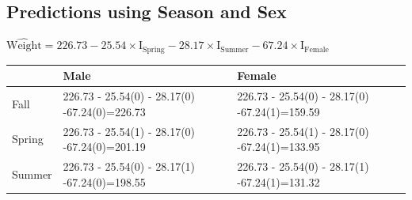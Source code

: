 \documentclass[]{book}
\begin{document}
\subsection{Predictions using Season and
Sex}\label{predictions-using-season-and-sex}

\(\widehat{\text{Weight}} = 226.73-25.54 \times\text{I}_{\text{Spring}}-28.17\times\text{I}_{\text{Summer}} -67.24\times\text{I}_{\text{Female}}\)

\begin{longtable}[]{@{}lll@{}}
\toprule
\begin{minipage}[b]{0.09\columnwidth}\raggedright\strut
\strut
\end{minipage} & \begin{minipage}[b]{0.14\columnwidth}\raggedright\strut
Male\strut
\end{minipage} & \begin{minipage}[b]{0.14\columnwidth}\raggedright\strut
Female\strut
\end{minipage}\tabularnewline
\midrule
\endhead
\begin{minipage}[t]{0.09\columnwidth}\raggedright\strut
Fall\strut
\end{minipage} & \begin{minipage}[t]{0.14\columnwidth}\raggedright\strut
226.73 - 25.54(0) - 28.17(0) -67.24(0)=226.73\strut
\end{minipage} & \begin{minipage}[t]{0.14\columnwidth}\raggedright\strut
226.73 - 25.54(0) - 28.17(0) -67.24(1)=159.59\strut
\end{minipage}\tabularnewline
\begin{minipage}[t]{0.09\columnwidth}\raggedright\strut
Spring\strut
\end{minipage} & \begin{minipage}[t]{0.14\columnwidth}\raggedright\strut
226.73 - 25.54(1) - 28.17(0) -67.24(0)=201.19\strut
\end{minipage} & \begin{minipage}[t]{0.14\columnwidth}\raggedright\strut
226.73 - 25.54(1) - 28.17(0) -67.24(1)=133.95\strut
\end{minipage}\tabularnewline
\begin{minipage}[t]{0.09\columnwidth}\raggedright\strut
Summer\strut
\end{minipage} & \begin{minipage}[t]{0.14\columnwidth}\raggedright\strut
226.73 - 25.54(0) - 28.17(1) -67.24(0)=198.55\strut
\end{minipage} & \begin{minipage}[t]{0.14\columnwidth}\raggedright\strut
226.73 - 25.54(0) - 28.17(1) -67.24(1)=131.32\strut
\end{minipage}\tabularnewline
\bottomrule
\end{longtable}
\end{document}
